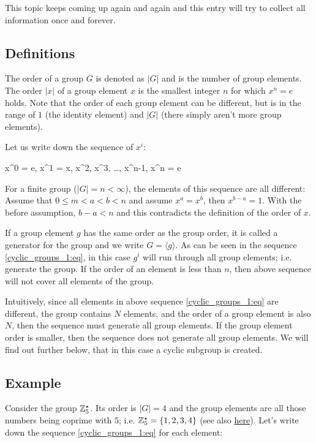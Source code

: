 
This topic keeps coming up again and again and this entry will try to collect all information once and forever.


\subsection{Definitions}

The order of a group $G$ is denoted as $|G|$ and is the number of group elements. The order $|x|$ of a group element $x$ is the smallest integer $n$ for which $x^n = e$ holds. Note that the order of each group element can be different, but is in the range of $1$ (the identity element) and $|G|$ (there simply aren't more group elements).

Let us write down the sequence of $x^i$:

\be\label{cyclic_groups_1:eq}
x^0 = e, x^1 = x, x^2, x^3, \ldots, x^{n-1}, x^n = e
\ee

For a finite group ($|G| = n < \infty$), the elements of this sequence are all different: Assume that $0 \leq m < a < b < n$ and assume $x^a = x^b$, then $x^{b-a}=1$. With the before assumption, $b-a < n$ and this contradicts the definition of the order of $x$.

If a group element $g$ has the same order as the group order, it is called a generator for the group and we write $G = \langle g \rangle$. As can be seen in the sequence \eqref{cyclic_groups_1:eq}, in this case $g^i$ will run through all group elements; i.e. generate the group. If the order of an element is less than $n$, then above sequence will not cover all elements of the group.

Intuitively, since all elements in above sequence \eqref{cyclic_groups_1:eq} are different, the group contains $N$ elements, and the order of a group element is also $N$, then the sequence must generate all group elements. If the group element order is smaller, then the sequence does not generate all group elements. We will find out further below, that in this case a cyclic subgroup is created.


\subsection{Example}

Consider the group $\mathbb{Z}_5^\star$. Its order is $|G| = 4$ and the group elements are all those numbers being coprime with $5$; i.e. $\mathbb{Z}_5^\star= \{1,2,3,4\}$ (see also \hyperref[2017-05-05:entry]{here}). Let's write down the sequence \eqref{cyclic_groups_1:eq} for each element:

